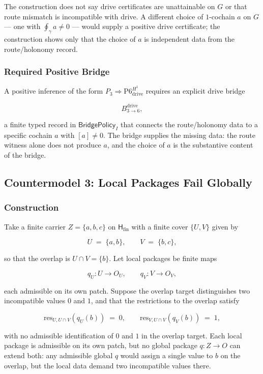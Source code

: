 \documentclass[11pt]{article}
\theoremstyle{definition}
\begin{document}
The construction does not say drive certificates are unattainable on \(G\) or that route mismatch is incompatible with drive. A different choice of \(1\)-cochain \(a\) on \(G\) --- one with \(\oint_\gamma a\neq 0\) --- would supply a positive drive certificate; the construction shows only that the choice of \(a\) is independent data from the route/holonomy record.

\subsubsection{Required Positive Bridge}

A positive inference of the form \(P_3\Rightarrow\mathrm{P6}_{\mathrm{drive}}^{H^1}\) requires an explicit drive bridge

\[
B_{3\to 6}^{\mathrm{drive}},
\]

a finite typed record in \(\mathsf{BridgePolicy}_I\) that connects the route/holonomy data to a specific cochain \(a\) with \([a]\neq 0\). The bridge supplies the missing data: the route witness alone does not produce \(a\), and the choice of \(a\) is the substantive content of the bridge.

\subsection{Countermodel 3: Local Packages Fail Globally}

\subsubsection{Construction}

Take a finite carrier \(Z=\{a,b,c\}\) on \(\mathsf H_{\mathrm{fin}}\) with a finite cover \(\{U,V\}\) given by

\[
U\;=\;\{a,b\},\qquad V\;=\;\{b,c\},
\]

so that the overlap is \(U\cap V=\{b\}\). Let local packages be finite maps

\[
q_U:U\to O_U,\qquad q_V:V\to O_V,
\]

each admissible on its own patch. Suppose the overlap target distinguishes two incompatible values \(0\) and \(1\), and that the restrictions to the overlap satisfy

\[
\mathrm{res}_{U,U\cap V}(q_U(b))\;=\;0,\qquad \mathrm{res}_{V,U\cap V}(q_V(b))\;=\;1,
\]

with no admissible identification of \(0\) and \(1\) in the overlap target. Each local package is admissible on its own patch, but no global package \(q:Z\to O\) can extend both: any admissible global \(q\) would assign a single value to \(b\) on the overlap, but the local data demand two incompatible values there.
\end{document}
